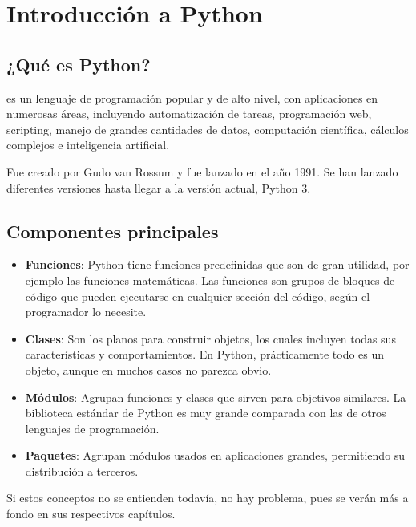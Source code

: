 \chapter{Introducción a Python}

\section{¿Qué es Python?}

 es un lenguaje de programación popular y de alto nivel, con aplicaciones en numerosas áreas, incluyendo automatización de tareas, programación web, scripting, manejo de grandes cantidades de datos, computación científica, cálculos complejos e inteligencia artificial.\smallskip

Fue creado por Gudo van Rossum y fue lanzado en el año 1991. Se han lanzado diferentes versiones hasta llegar a la versión actual, Python 3.

\section{Componentes principales}

\begin{itemize}
  \item \textbf{Funciones}: Python tiene funciones predefinidas que son de gran utilidad, por ejemplo las funciones matemáticas. Las funciones son grupos de bloques de código que pueden ejecutarse en cualquier sección del código, según el programador lo necesite.
  
  \item \textbf{Clases}: Son los planos para construir objetos, los cuales incluyen todas sus características y comportamientos. En Python, prácticamente todo es un objeto, aunque en muchos casos no parezca obvio.
  
  \item \textbf{Módulos}: Agrupan funciones y clases que sirven para objetivos similares. La biblioteca estándar de Python es muy grande comparada con las de otros lenguajes de programación.
  
  \item \textbf{Paquetes}: Agrupan módulos usados en aplicaciones grandes, permitiendo su distribución a terceros.
  
\end{itemize}

Si estos conceptos no se entienden todavía, no hay problema, pues se verán más a fondo en sus respectivos capítulos.


